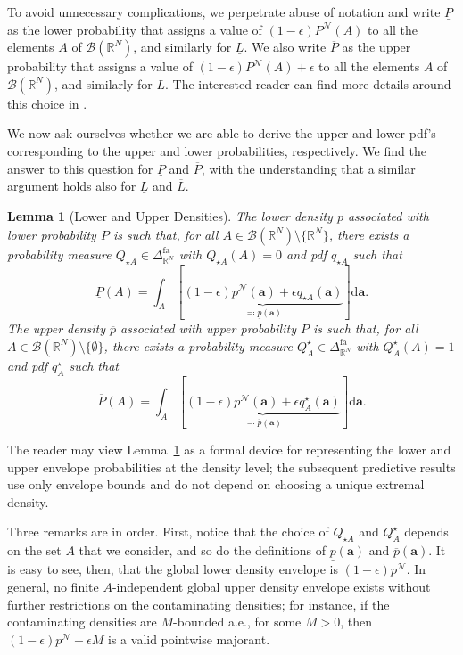 \documentclass[12pt, english, oneside, a4paper]{article}
\newtheorem{lemma}[theorem]{Lemma}
\renewcommand{\a}{\boldsymbol{a}}
\begin{document}
To avoid unnecessary complications, we perpetrate abuse of notation and write $\underline{P}$ as the lower probability that assigns a value of $(1-\epsilon)P^\mathcal{N}(A)$ to all the elements $A$ of $\mathcal{B}(\mathbb{R}^N)$, and similarly for $\underline{L}$. We also write $\overline{P}$ as the upper probability that assigns a value of $(1-\epsilon)P^\mathcal{N}(A) + \epsilon$ to all the elements $A$ of $\mathcal{B}(\mathbb{R}^N)$, and similarly for $\overline{L}$. The interested reader can find more details around this choice in \citet[Section 3 and Appendix A]{caprio2025optimaltransportepsiloncontaminatedcredal}.


We now ask ourselves whether we are able to derive the upper and lower pdf's corresponding to the upper and lower probabilities, respectively. We find the answer to this question for $\underline{P}$ and $\overline{P}$, with the understanding that a similar argument holds also for $\underline{L}$ and $\overline{L}$.

\begin{lemma}[Lower and Upper Densities]\label{low_up_dens}
    The lower density $\underline{p}$ associated with lower probability $\underline{P}$ is such that, for all $A\in\mathcal{B}(\mathbb{R}^N)\setminus\{\mathbb{R}^N\}$, there exists a probability measure $Q_{\star A} \in \Delta_{\mathbb{R}^N}^\text{fa}$
    with $Q_{\star A}(A)=0$ and pdf $q_{\star A}$ such that
    $$\underline{P}(A)=\int_A [\underbrace{(1-\epsilon)p^\mathcal{N}(\a) + \epsilon q_{\star A}(\a)}_{\eqqcolon \underline{p}(\a)}] \text{d}\a.$$
    The upper density $\overline{p}$ associated with upper probability $\overline{P}$ is such that, for all $A\in\mathcal{B}(\mathbb{R}^N) \setminus \{\emptyset\}$, there exists a probability measure $Q_{A}^\star \in \Delta_{\mathbb{R}^N}^\text{fa}$ with $Q_{A}^\star(A)=1$ and pdf $q_{A}^\star$ such that 
    $$\overline{P}(A)=\int_A [\underbrace{(1-\epsilon)p^\mathcal{N}(\a) + \epsilon q_{A}^\star(\a)}_{\eqqcolon \overline{p}(\a)}] \text{d}\a.$$
\end{lemma}
The reader may view Lemma~\ref{low_up_dens} as a formal device for representing the lower and upper envelope probabilities at the density level; the subsequent predictive results use only envelope bounds and do not depend on choosing a unique extremal density.

Three remarks are in order. First, notice that the choice of $Q_{\star A}$ and $Q_{A}^\star$ depends on the set $A$ that we consider, and so do the definitions of $\underline{p}(\a)$ and $\overline{p}(\a)$. 
It is easy to see, then, that the global lower density envelope is $(1-\epsilon) p^\mathcal{N}$. In general, no finite $A$-independent global upper density envelope exists without further restrictions on the contaminating densities; for instance, if the contaminating densities are $M$-bounded a.e., for some $M>0$, then $(1-\epsilon) p^\mathcal{N} + \epsilon M$ is a valid pointwise majorant.
\end{document}
